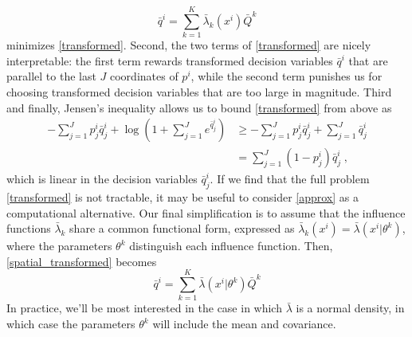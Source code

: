 \documentclass[english]{scrartcl}
\begin{document}
	\begin{equation}
		\bar{q}^i = \sum_{k=1}^K \bar{\lambda}_k(x^i) \bar{Q}^k \label{spatial_transformed}
	\end{equation}
	minimizes \eqref{transformed}.
	Second, the two terms of \eqref{transformed} are nicely interpretable: the first term rewards transformed decision variables $\bar{q}^i$ that are parallel to the last $J$ coordinates of $p^i$, while the second term punishes us for choosing transformed decision variables that are too large in magnitude. Third and finally, Jensen's inequality allows us to bound \eqref{transformed} from above as
	\begin{align}
		- \sum_{j = 1}^J p^i_j \bar{q}^i_j  + \log \left(1 + \sum_{j = 1}^J e^{\bar{q}^i_j}\right) &\geq - \sum_{j = 1}^J p^i_j \bar{q}^i_j + \sum_{j=1}^J \bar{q}_j^i \\
		&= \sum_{j=1}^J (1 - p_j^i)\bar{q}_j^i\;, \label{approx}
	\end{align}
	which is linear in the decision variables $\bar{q}_j^i$. If we find that the full problem \eqref{transformed} is not tractable, it may be useful to consider \eqref{approx} as a computational alternative.
	Our final simplification is to assume that the influence functions $\bar{\lambda}_k$ share a common functional form, expressed as $\bar{\lambda}_k(x^i) = \bar{\lambda}(x^i|\theta^k)$, where the parameters $\theta^k$ distinguish each influence function. Then, \eqref{spatial_transformed} becomes
	\begin{equation}
		\bar{q}^i = \sum_{k=1}^K \bar{\lambda}(x^i|\theta^k) \bar{Q}^k \label{spatial_transformed_2}
	\end{equation}
	In practice, we'll be most interested in the case in which $\bar{\lambda}$ is a normal density, in which case the parameters $\theta^k$ will include the mean and covariance.
\end{document}
